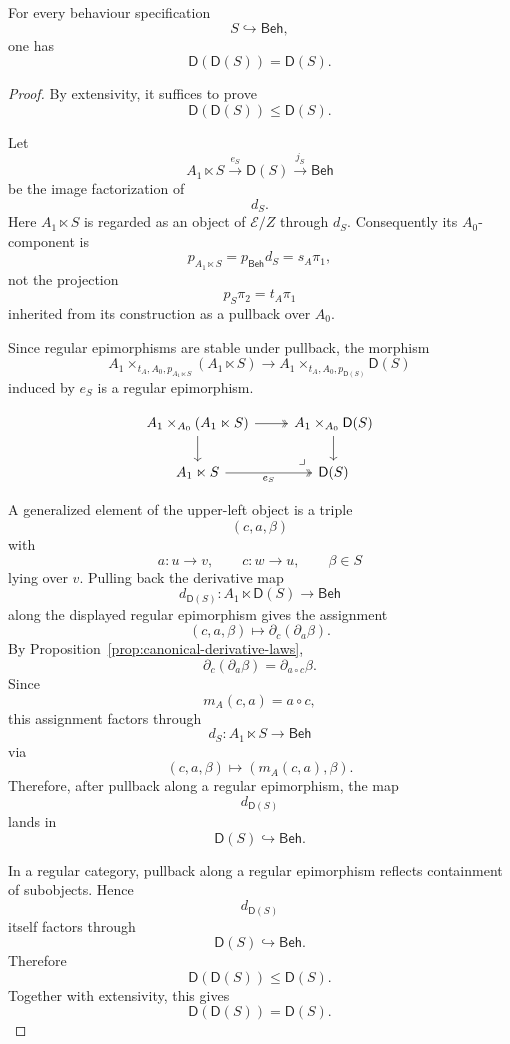 \begin{proposition}[Idempotence]
\label{prop:residual-closure-idempotent}
For every behaviour specification
\[
S\hookrightarrow\mathsf{Beh},
\]
one has
\[
\mathsf D(\mathsf D(S))=\mathsf D(S).
\]
\end{proposition}

\begin{proof}
By extensivity, it suffices to prove
\[
\mathsf D(\mathsf D(S))\leq \mathsf D(S).
\]

Let
\[
A_1\ltimes S
\xrightarrow{e_S}
\mathsf D(S)
\xrightarrow{j_S}
\mathsf{Beh}
\]
be the image factorization of
\[
d_S.
\]
Here \(A_1\ltimes S\) is regarded as an object of \(\mathcal E/Z\) through
\(d_S\). Consequently its \(A_0\)-component is
\[
p_{A_1\ltimes S}
=
p_{\mathsf{Beh}}d_S
=
s_A\pi_1,
\]
not the projection
\[
p_S\pi_2=t_A\pi_1
\]
inherited from its construction as a pullback over \(A_0\).

Since regular epimorphisms are stable under pullback, the morphism
\[
A_1\times_{t_A,A_0,p_{A_1\ltimes S}}(A_1\ltimes S)
\longrightarrow
A_1\times_{t_A,A_0,p_{\mathsf D(S)}}\mathsf D(S)
\]
induced by \(e_S\) is a regular epimorphism.

\[
\begin{tikzcd}
A_1\times_{A_0}(A_1\ltimes S)
\arrow[r, two heads]
\arrow[d]
&
A_1\times_{A_0}\mathsf D(S)
\arrow[d]
\\
A_1\ltimes S
\arrow[r, two heads, "e_S"']
&
\mathsf D(S)
\arrow[ul, phantom, "\lrcorner", very near start]
\end{tikzcd}
\]

A generalized element of the upper-left object is a triple
\[
(c,a,\beta)
\]
with
\[
a:u\to v,
\qquad
c:w\to u,
\qquad
\beta\in S
\]
lying over \(v\). Pulling back the derivative map
\[
d_{\mathsf D(S)}:
A_1\ltimes \mathsf D(S)\to\mathsf{Beh}
\]
along the displayed regular epimorphism gives the assignment
\[
(c,a,\beta)
\longmapsto
\partial_c(\partial_a\beta).
\]
By Proposition~\ref{prop:canonical-derivative-laws},
\[
\partial_c(\partial_a\beta)
=
\partial_{a\circ c}\beta.
\]
Since
\[
m_A(c,a)=a\circ c,
\]
this assignment factors through
\[
d_S:A_1\ltimes S\to\mathsf{Beh}
\]
via
\[
(c,a,\beta)\longmapsto (m_A(c,a),\beta).
\]
Therefore, after pullback along a regular epimorphism, the map
\[
d_{\mathsf D(S)}
\]
lands in
\[
\mathsf D(S)\hookrightarrow\mathsf{Beh}.
\]

In a regular category, pullback along a regular epimorphism reflects
containment of subobjects. Hence
\[
d_{\mathsf D(S)}
\]
itself factors through
\[
\mathsf D(S)\hookrightarrow\mathsf{Beh}.
\]
Therefore
\[
\mathsf D(\mathsf D(S))\leq \mathsf D(S).
\]
Together with extensivity, this gives
\[
\mathsf D(\mathsf D(S))=\mathsf D(S).
\]
\end{proof}

